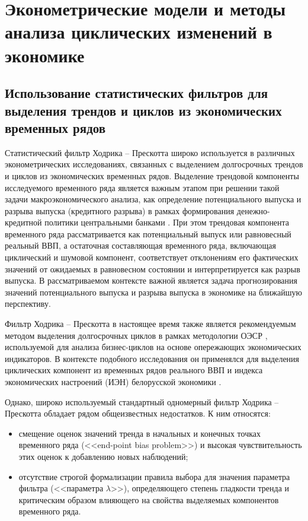 \documentclass[a4paper,14pt]{extreport}
\begin{document}
	
	\chapter{Эконометрические модели и методы анализа циклических изменений в экономике}
	
	
	\section{Использование статистических фильтров для выделения трендов и циклов из экономических временных рядов}
	
	Статистический фильтр Ходрика -- Прескотта \cite{hp_orig_paper} широко используется в различных эконометрических исследованиях, связанных с выделением долгосрочных трендов и циклов из экономических временных рядов. Выделение трендовой компоненты исследуемого временного ряда является важным этапом при решении такой задачи макроэкономического анализа, как определение потенциального выпуска и разрыва выпуска (кредитного разрыва) в рамках формирования денежно-кредитной политики центральными банками \cite{zubarev_gap, demidenko_gap, schuler_detrend}. При этом трендовая компонента временного ряда рассматривается как потенциальный выпуск или равновесный реальный ВВП, а остаточная составляющая временного ряда, включающая циклический и шумовой компонент,  соответствует отклонениям его фактических значений  от ожидаемых в равновесном состоянии и интерпретируется как разрыв выпуска. В рассматриваемом контексте важной является задача прогнозирования значений потенциального выпуска и разрыва выпуска в экономике на ближайшую перспективу. 
	
	Фильтр Ходрика -- Прескотта в настоящее время также является рекомендуемым методом выделения долгосрочных циклов в рамках методологии ОЭСР \cite{oecdCLI, oecdCycleExtraction}, используемой для анализа бизнес-циклов на основе опережающих экономических индикаторов. В контексте подобного исследования он применялся для выделения циклических компонент из временных рядов реального ВВП и индекса экономических настроений (ИЭН) белорусской экономики \cite{esiMakingAlt}. 
	
	Однако, широко используемый стандартный одномерный фильтр Ходрика -- Прескотта обладает рядом общеизвестных недостатков.  К ним относятся: 
	
	\begin{itemize}
		\item смещение оценок значений тренда в начальных и конечных точках временного ряда (<<end-point bias problem>>) и высокая чувствительность этих оценок к добавлению новых наблюдений; 
		\item отсутствие строгой формализации правила выбора для значения параметра фильтра (<<параметра $\lambda$>>), определяющего степень гладкости тренда и критическим образом влияющего на свойства выделяемых компонентов временного ряда.
	\end{itemize}
	
\end{document}
